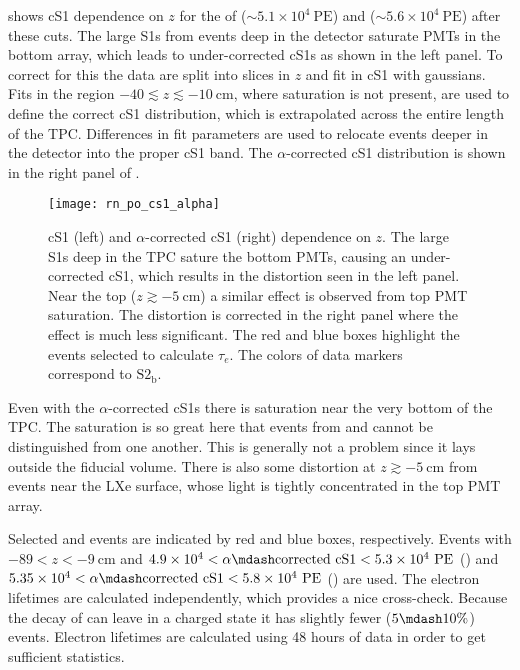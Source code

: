  shows cS1 dependence on $z$ for the \alphadecays of 
(${\sim} 5.1 \times 10^4 \ \mathrm{PE}$) and  (${\sim} 5.6 \times 10^4\ \mathrm{PE}$) after these cuts.  The large
S1s from events deep in the detector saturate PMTs in the bottom array, which leads to under-corrected cS1s as shown in the left
panel.  To correct for this the data are split into slices in $z$ and fit in cS1 with gaussians.  Fits in the region
$-40 \lesssim z \lesssim -10\ \mathrm{cm}$, where saturation is not present, are used to define the correct cS1 distribution, which is
extrapolated across the entire length of
the TPC.  Differences in fit parameters are used to relocate events deeper in the detector into the proper cS1 band.  The
$\alpha$-corrected cS1 distribution is shown in the right panel of .

\begin{figure}
\centering
\texttt{[image: rn\_po\_cs1\_alpha]}
\caption{cS1 (left) and $\alpha$-corrected cS1 (right) dependence on $z$.  The large \alphadecay S1s deep in
the TPC sature the bottom PMTs, causing an under-corrected cS1, which
results in the distortion seen in the left panel.  Near the top ($z \gtrsim -5\ \mathrm{cm}$) a similar effect is observed from top PMT
saturation.  The distortion is corrected in the right panel where the effect is much less significant.  The red and blue boxes highlight
the events selected to calculate $\tau_e$.  The colors of data markers correspond to $\mathrm{S2_b}$.}
\label{fig:electron_lifetimes_measurement_alphas_s1}
\end{figure}

Even with the $\alpha$-corrected cS1s there is saturation near the very bottom of the TPC.  The saturation is so great
here that events from  and  cannot be distinguished from one another.  This is generally not a problem since it
lays outside the fiducial volume.  There is also some distortion at $z \gtrsim -5\ \mathrm{cm}$ from events
near the LXe surface, whose light is tightly concentrated in the top PMT array.

Selected  and  events are indicated by red and blue boxes, respectively.  Events with $-89< z < -9\ \mathrm{cm}$
and $4.9 \times 10^4 < \alpha \mdash \mathrm{corrected\ cS1} < 5.3 \times 10^4\ \mathrm{PE}$ () and
$5.35 \times 10^4 < \alpha \mdash \mathrm{corrected\ cS1} < 5.8 \times 10^4\ \mathrm{PE}$ () are used.  The electron
lifetimes are calculated independently, which provides a nice cross-check.  Because the decay of  can leave 
in a charged state it has slightly fewer ($5 \mdash 10\%$) events.  Electron lifetimes are calculated using 48 hours of data in order to
get sufficient statistics.

